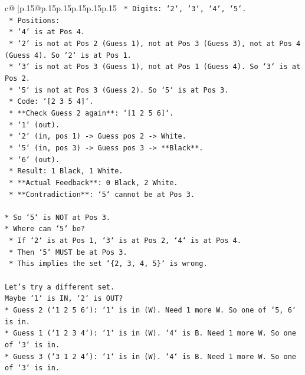 \documentclass{article}
\begin{document}
{\begin{supertabular}{c@{$\;$}|p{.15\linewidth}@{}p{.15\linewidth}p{.15\linewidth}p{.15\linewidth}p{.15\linewidth}p{.15\linewidth}}
{{{\texttt{        *   Digits: `2`, `3`, `4`, `5`.} \\
\texttt{        *   Positions:} \\
\texttt{            *   `4` is at Pos 4.} \\
\texttt{            *   `2` is not at Pos 2 (Guess 1), not at Pos 3 (Guess 3), not at Pos 4 (Guess 4). So `2` is at Pos 1.} \\
\texttt{            *   `3` is not at Pos 3 (Guess 1), not at Pos 1 (Guess 4). So `3` is at Pos 2.} \\
\texttt{            *   `5` is not at Pos 3 (Guess 2). So `5` is at Pos 3.} \\
\texttt{            *   Code: `{[}2 3 5 4{]}`.} \\
\texttt{            *   **Check Guess 2 again**: `{[}1 2 5 6{]}`.} \\
\texttt{                *   `1` (out).} \\
\texttt{                *   `2` (in, pos 1) {-}> Guess pos 2 {-}> White.} \\
\texttt{                *   `5` (in, pos 3) {-}> Guess pos 3 {-}> **Black**.} \\
\texttt{                *   `6` (out).} \\
\texttt{                *   Result: 1 Black, 1 White.} \\
\texttt{                *   **Actual Feedback**: 0 Black, 2 White.} \\
\texttt{                *   **Contradiction**: `5` cannot be at Pos 3.} \\
\\ 
\texttt{*   So `5` is NOT at Pos 3.} \\
\texttt{*   Where can `5` be?} \\
\texttt{    *   If `2` is at Pos 1, `3` is at Pos 2, `4` is at Pos 4.} \\
\texttt{    *   Then `5` MUST be at Pos 3.} \\
\texttt{    *   This implies the set `\{2, 3, 4, 5\}` is wrong.} \\
\\ 
\texttt{Let's try a different set.} \\
\texttt{Maybe `1` is IN, `2` is OUT?} \\
\texttt{*   Guess 2 (`1 2 5 6`): `1` is in (W). Need 1 more W. So one of `5, 6` is in.} \\
\texttt{*   Guess 1 (`1 2 3 4`): `1` is in (W). `4` is B. Need 1 more W. So one of `3` is in.} \\
\texttt{*   Guess 3 (`3 1 2 4`): `1` is in (W). `4` is B. Need 1 more W. So one of `3` is in.} \\
}}}
\end{supertabular}}
\end{document}
